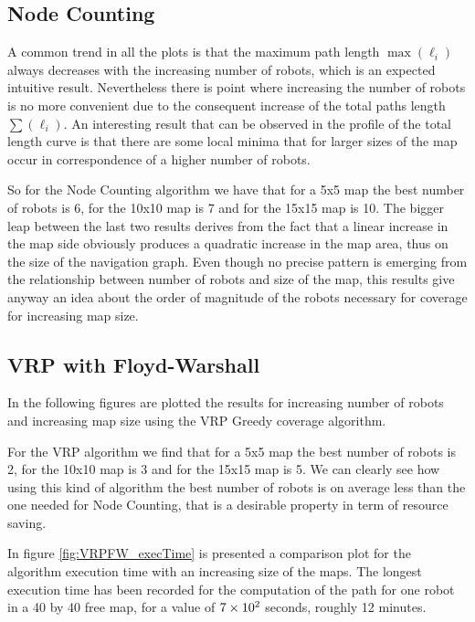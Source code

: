 
\subsection{Node Counting}
A common trend in all the plots is that the maximum path length $\max (\ell_i)$ always decreases with the increasing number of robots, which is an expected intuitive result. Nevertheless there is point where increasing the number of robots is no more convenient due to the consequent increase of the total paths length $\sum (\ell_i)$. An interesting result that can be observed in the profile of the total length curve is that there are some local minima that for larger sizes of the map occur in correspondence of a higher number of robots.

%







So for the Node Counting algorithm we have that for a 5x5 map the best number of robots is 6, for the 10x10 map is 7 and for the 15x15 map is 10. The bigger leap between the last two results derives from the fact that a linear increase in the map side obviously produces a quadratic increase in the map area, thus on the size of the navigation graph. Even though no precise pattern is emerging from the relationship between number of robots and size of the map, this results give anyway an idea about the order of magnitude of the robots necessary for coverage for increasing map size.






\subsection{VRP with Floyd-Warshall}
In the following figures are plotted the results for increasing number of robots and increasing map size using the VRP Greedy coverage algorithm.

%



For the VRP algorithm we find that for a 5x5 map the best number of robots is 2, for the 10x10 map is 3 and for the 15x15 map is 5. We can clearly see how using this kind of algorithm the best number of robots is on average less than the one needed for Node Counting, that is a desirable property in term of resource saving.





In figure \ref{fig:VRPFW_execTime} is presented a comparison plot for the algorithm execution time with an increasing size of the maps.  The longest execution time has been recorded for the computation of the path for one robot in a 40 by 40 free map, for a value of $7\times 10^{2}$ seconds, roughly 12 minutes.






